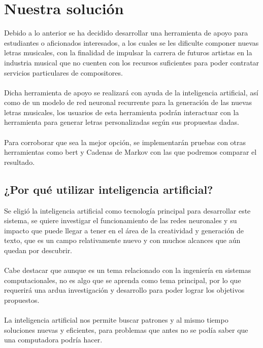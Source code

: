 \documentclass[12pt, a4paper, titlepage]{report}
\begin{document}
	\section{Nuestra solución} %
	   Debido a lo anterior se ha decidido desarrollar una herramienta de apoyo para estudiantes o aficionados interesados, a los cuales se les dificulte componer nuevas letras musicales, con la finalidad de impulsar la carrera de futuros artistas en la industria musical que no cuenten con los recursos suficientes para poder contratar servicios particulares de compositores.\\\\
	   Dicha herramienta de apoyo se realizará con ayuda de la inteligencia artificial, así como de un modelo de red neuronal recurrente para la generación de las nuevas letras musicales, los usuarios de esta herramienta podrán interactuar con la herramienta para generar letras personalizadas según sus propuestas dadas.\\\\
	   Para corroborar que sea la mejor opción, se implementarán pruebas con otras herramientas como \acrshort{bert} y Cadenas de Markov con las que podremos comparar el resultado.
	   
	   	 \subsection{¿Por qué utilizar inteligencia artificial?}
	   	 Se eligió la inteligencia artificial como tecnología principal para desarrollar este sistema, se quiere investigar el funcionamiento de las redes neuronales y su impacto que puede llegar a tener en el área de la creatividad y generación de texto, que es un campo relativamente nuevo y con muchos alcances que aún quedan por descubrir.\\\\
	   	 Cabe destacar que aunque es un tema relacionado con la ingeniería en sistemas computacionales, no es algo que se aprenda como tema principal, por lo que requerirá una ardua investigación y desarrollo para poder lograr los objetivos propuestos.\\\\
	   	 La inteligencia artificial nos permite buscar patrones y al mismo tiempo soluciones nuevas y eficientes, para problemas que antes no se podía saber que una computadora podría hacer.
	   	 
\end{document}
